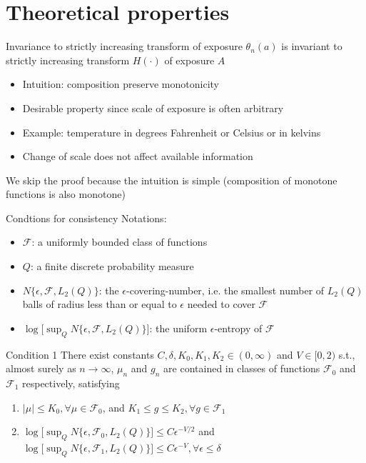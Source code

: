 \documentclass{beamer}
\begin{document}
\section{Theoretical properties}

\begin{frame}{Invariance to strictly increasing transform of exposure}
  $\theta_n(a)$ is invariant to strictly increasing transform $H(\cdot)$ of exposure $A$
  \begin{itemize}
    \item Intuition: composition preserve monotonicity
    \item Desirable property since scale of exposure is often arbitrary
    \item Example: temperature in degrees Fahrenheit or Celsius or in kelvins
    \item Change of scale does not affect available information
  \end{itemize}
  We skip the proof because the intuition is simple (composition of monotone functions is also monotone)
\end{frame}

\begin{frame}{Condtions for consistency}
  Notations:
  \begin{itemize}
    \item $\mathcal{F}$: a uniformly bounded class of functions
    \item $Q$: a finite discrete probability measure
    \item $N\{ \epsilon, \mathcal{F}, L_2(Q) \}$: the $\epsilon$-covering-number, i.e. the smallest number of $L_2(Q)$ balls of radius less than or equal to $\epsilon$ needed to cover $\mathcal{F}$
    \item $\log\big[ \sup_Q N\{ \epsilon, \mathcal{F}, L_2(Q) \} \big]$: the uniform $\epsilon$-entropy of $\mathcal{F}$
  \end{itemize}
  \begin{block}{Condition 1}
    There exist constants $C, \delta, K_0, K_1, K_2 \in (0, \infty)$ and $V \in [0,2)$ s.t., almost surely as $n \rightarrow \infty$, $\mu_n$ and $g_n$ are contained in classes of functions $\mathcal{F}_0$ and $\mathcal{F}_1$ respectively, satisfying
    \begin{enumerate}
      \item $|\mu| \le K_0, \forall \mu \in \mathcal{F}_0$, and $K_1 \le g \le K_2, \forall g \in \mathcal{F}_1$
      \item $\log\big[ \sup_Q N\{ \epsilon, \mathcal{F}_0, L_2(Q) \} \big] \le C \epsilon^{-V/2}$ and $\log\big[ \sup_Q N\{ \epsilon, \mathcal{F}_1, L_2(Q) \} \big] \le C \epsilon^{-V}, \forall \epsilon \le \delta$
    \end{enumerate}
  \end{block}
\end{frame}
\end{document}
